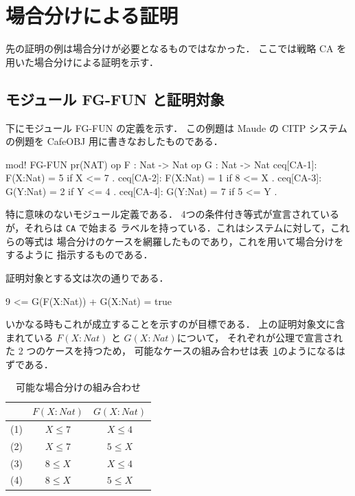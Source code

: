\documentclass[a4paper,oneside,10pt,here]{memoir}
\newenvironment{vvtm}%
{\parskip=0pt\lineskip=0pt\begin{center}\begin{minipage}{0.8\textwidth}\begin{snugshade}}%
  {\end{snugshade}\end{minipage}\end{center}}
\begin{document}
\section{場合分けによる証明}
先の証明の例は場合分けが必要となるものではなかった．
ここでは戦略 CA を用いた場合分けによる証明を示す．

\subsection{モジュール FG-FUN と証明対象}

下にモジュール FG-FUN の定義を示す．
この例題は Maude の CITP システムの例題を CafeOBJ 用に書きなおしたものである．

\begin{vvtm}
  \begin{simplev}
mod! FG-FUN {
  pr(NAT)
  op F : Nat -> Nat 
  op G : Nat -> Nat
  ceq[CA-1]: F(X:Nat) = 5 if X <= 7 .
  ceq[CA-2]: F(X:Nat) = 1 if 8 <= X .
  ceq[CA-3]: G(Y:Nat) = 2 if Y <= 4 .
  ceq[CA-4]: G(Y:Nat) = 7 if 5 <= Y .
}
  \end{simplev}
\end{vvtm}

特に意味のないモジュール定義である．
4つの条件付き等式が宣言されているが，それらは \texttt{CA} で始まる
ラベルを持っている．これはシステムに対して，これらの等式は
場合分けのケースを網羅したものであり，これを用いて場合分けをするように
指示するものである．

証明対象とする文は次の通りである．
\begin{vvtm}
  \begin{simplev}
9 <= G(F(X:Nat)) + G(X:Nat) = true
  \end{simplev}
\end{vvtm}
いかなる時もこれが成立することを示すのが目標である．
上の証明対象文に含まれている $F(X:Nat)$ と $G(X:Nat)$について， 
それぞれが公理で宣言された 2 つのケースを持つため，
可能なケースの組み合わせは表~\ref{tab:cases}のようになるはずである．
\begin{table}
\label{tab:cases}
\caption{可能な場合分けの組み合わせ}
\begin{center}
\begin{tabular}[htb]{|c|c|c|}\hline
&$F(X:Nat)$ & $G(X:Nat)$ \\\hline
(1)&$X \le 7$ & $X \le 4$ \\
(2)&$X \le 7$ & $5 \le X$ \\
(3)&$8 \le X$ & $X \le 4$ \\
(4)&$8 \le X$ & $5 \le X$ \\\hline 
\end{tabular}
\end{center}
\end{table}
\end{document}
